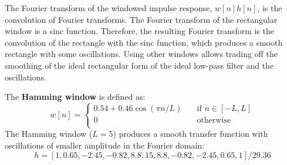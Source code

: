 The Fourier transform of the windowed impulse response, $w [n] h[n]$, is the convolution of Fourier transforms. The Fourier transform of the rectangular window is a sinc function. Therefore, the resulting Fourier transform is the convolution of the rectangle with the sinc function, which produces a smooth rectangle with some oscillations. Using other windows allows trading off the smoothing of the ideal rectangular form of the ideal low-pass filter and the oscillations. 

The {\bf Hamming window} is defined as:
\begin{equation}
w  \left[n\right] =  \begin{cases}
    0.54+0.46 \cos (\pi n/L)     & \quad \text{if }  n \in  \left[-L, L\right] \\
    0       & \quad \text{otherwise }\\
\end{cases}
\end{equation}
The Hamming window ($L=5$) produces a smooth transfer function with oscillations of smaller amplitude in the Fourier domain:
\begin{equation}
h = [1, 0.65, -2.45, -0.82, 8.8, 15, 8.8, -0.82, -2.45, 0.65, 1] / 29.36
\end{equation}

